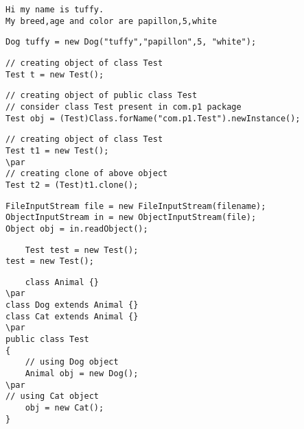 \documentclass{book}
\def\lthtmlcheckvsize{\ifdim\ht\sizebox<\vsize 
  \ifdim\wd\sizebox<\hsize\expandafter\hfill\fi \expandafter\vfill
  \else\expandafter\vss\fi}%
\begin{document}
{\newpage\clearpage
{}%
\begin{lstlisting}
Hi my name is tuffy.
My breed,age and color are papillon,5,white
\end{lstlisting}%
\lthtmlfigureZ
\lthtmlcheckvsize\clearpage}

{\newpage\clearpage
{}%
\begin{lstlisting}
Dog tuffy = new Dog("tuffy","papillon",5, "white");
\end{lstlisting}%
\lthtmlfigureZ
\lthtmlcheckvsize\clearpage}

{\newpage\clearpage
{}%
\begin{lstlisting}
// creating object of class Test
Test t = new Test();
\end{lstlisting}%
\lthtmlfigureZ
\lthtmlcheckvsize\clearpage}

{\newpage\clearpage
{}%
\begin{lstlisting}
// creating object of public class Test
// consider class Test present in com.p1 package
Test obj = (Test)Class.forName("com.p1.Test").newInstance();
\end{lstlisting}%
\lthtmlfigureZ
\lthtmlcheckvsize\clearpage}

{\newpage\clearpage
{}%
\begin{lstlisting}    
// creating object of class Test
Test t1 = new Test();
\par
// creating clone of above object
Test t2 = (Test)t1.clone();
\end{lstlisting}%
\lthtmlfigureZ
\lthtmlcheckvsize\clearpage}

{\newpage\clearpage
{}%
\begin{lstlisting}
FileInputStream file = new FileInputStream(filename);
ObjectInputStream in = new ObjectInputStream(file);
Object obj = in.readObject();
\end{lstlisting}%
\lthtmlfigureZ
\lthtmlcheckvsize\clearpage}

{\newpage\clearpage
{}%
\begin{lstlisting}
	Test test = new Test();
test = new Test();
	\end{lstlisting}%
\lthtmlfigureZ
\lthtmlcheckvsize\clearpage}

{\newpage\clearpage
{}%
\begin{lstlisting}
	class Animal {}
\par
class Dog extends Animal {}
class Cat extends Animal {}
\par
public class Test
{
    // using Dog object
    Animal obj = new Dog();
\par
// using Cat object
    obj = new Cat();
}   
	\end{lstlisting}%
\lthtmlfigureZ
\lthtmlcheckvsize\clearpage}
\end{document}
